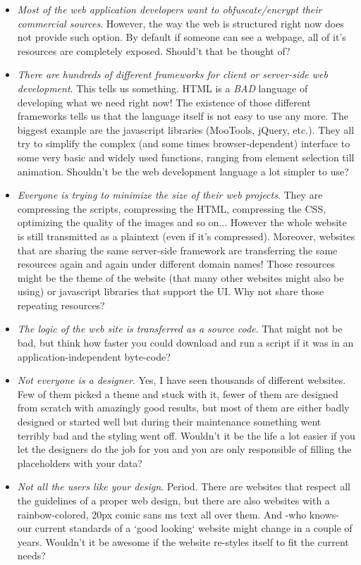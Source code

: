 \documentclass[a4paper]{article}
\begin{document}
\begin{itemize}
  \item \emph{Most of the web application developers want to obfuscate/encrypt their commercial sources}. However, the way the web is structured right now does not provide such option. By default if someone can see a webpage, all of it's resources are completely exposed. Should't that be thought of?
  \item \emph{There are hundreds of different frameworks for client or server-side web development}. This tells us something. HTML is a \emph{BAD} language of developing what we need right now! The existence of those different frameworks tells us that the language itself is not easy to use any more. The biggest example are the javascript libraries (MooTools, jQuery, etc.). They all try to simplify the complex (and some times browser-dependent) interface to some very basic and widely used functions, ranging from element selection till animation. Shouldn't be the web development language a lot simpler to use?
  \item \emph{Everyone is trying to minimize the size of their web projects}. They are compressing the scripts, compressing the HTML, compressing the CSS, optimizing the quality of the images and so on... However the whole website is still transmitted as a plaintext (even if it's compressed). Moreover, websites that are sharing the same server-side framework are transferring the same resources again and again under different domain names!  Those resources might be the theme of the website (that many other websites might also be using) or javascript libraries that support the UI. Why not share those repeating resources?
  \item \emph{The logic of the web site is transferred as a source code}. That might not be bad, but think how faster you could download and run a script if it was in an application-independent byte-code?
  \item \emph{Not everyone is a designer}. Yes, I have seen thousands of different websites. Few of them picked a theme and stuck with it, fewer of them are designed from scratch with amazingly good results, but most of them are either badly designed or started well but during their maintenance something went terribly bad and the styling went off. Wouldn't it be the life a lot easier if you let the designers do the job for you and you are only responsible of filling the placeholders with your data?
  \item \emph{Not all the users like your design}. Period. There are websites that respect all the guidelines of a proper web design, but there are also websites with a rainbow-colored, 20px comic sans ms text all over them. And -who knows- our current standards of a `good looking` website might change in a couple of years. Wouldn't it be awesome if the website re-styles itself to fit the current needs?

\end{itemize}
\end{document}
